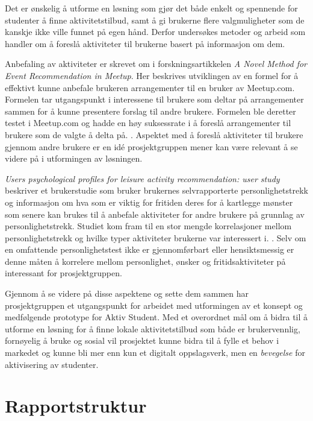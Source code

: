 Det er ønskelig å utforme en løsning som gjør det både enkelt og spennende for studenter å finne aktivitetstilbud, samt å gi brukerne flere valgmuligheter som de kanskje ikke ville funnet på egen hånd. Derfor undersøkes metoder og arbeid som handler om å foreslå aktiviteter til brukerne basert på informasjon om dem.

Anbefaling av aktiviteter er skrevet om i forskningsartikkelen {\em A Novel Method for Event Recommendation in Meetup}. Her beskrives utviklingen av en formel for å effektivt kunne anbefale brukeren arrangementer til en bruker av Meetup.com. Formelen tar utgangspunkt i interessene til brukere som deltar på arrangementer sammen for å kunne presentere forslag til andre brukere. Formelen ble deretter testet i Meetup.com og hadde en høy suksessrate i å foreslå arrangementer til brukere som de valgte å delta på. \cite{MEETUP:7:ASONAM17}. Aspektet med å foreslå aktiviteter til brukere gjennom andre brukere er en idé prosjektgruppen mener kan være relevant å se videre på i utformingen av løsningen.

{\em Users psychological profiles for leisure activity recommendation: user study} beskriver et brukerstudie som bruker brukernes selvrapporterte personlighetstrekk og informasjon om hva som er viktig for fritiden deres for å kartlegge mønster som senere kan brukes til å anbefale aktiviteter for andre brukere på grunnlag av personlighetstrekk. Studiet kom fram til en stor mengde korrelasjoner mellom personlighetstrekk og hvilke typer aktiviteter brukerne var interessert i. \cite{PROFILES:10:CITREC17}. Selv om en omfattende personlighetstest ikke er gjennomførbart eller hensiktsmessig er denne måten å korrelere mellom personlighet, ønsker og fritidsaktiviteter på interessant for prosjektgruppen. 

Gjennom å se videre på disse aspektene og sette dem sammen har prosjektgruppen et utgangspunkt for arbeidet med utformingen av et konsept og medfølgende prototype for Aktiv Student. Med et overordnet mål om å bidra til å utforme en løsning for å finne lokale aktivitetstilbud som både er brukervennlig, fornøyelig å bruke og sosial vil prosjektet kunne bidra til å fylle et behov i markedet og kunne bli mer enn kun et digitalt oppslagsverk, men en {\em bevegelse} for aktivisering av studenter.

\section{Rapportstruktur}

